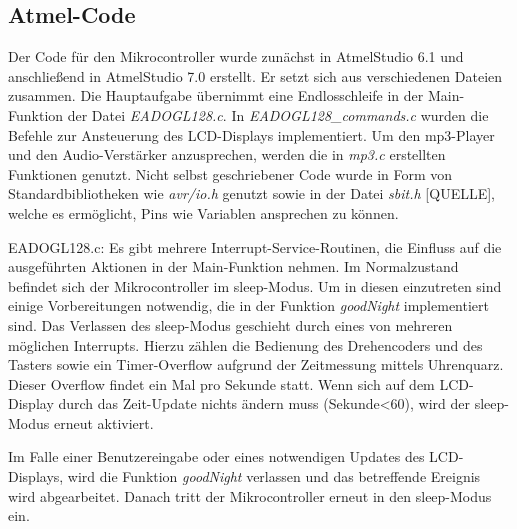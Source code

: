 \documentclass[journal, a4paper]{IEEEtran}
\begin{document}
	\subsection{Atmel-Code}
	\label{sc:Software:subsc:Atmel-Code}
	Der Code für den Mikrocontroller wurde zunächst in AtmelStudio 6.1 und anschließend in AtmelStudio 7.0 erstellt. Er setzt sich aus verschiedenen Dateien zusammen. Die Hauptaufgabe übernimmt eine Endlosschleife in der Main-Funktion der Datei \emph{EADOGL128.c}. In \emph{EADOGL128\_commands.c} wurden die Befehle zur Ansteuerung des LCD-Displays implementiert. Um den mp3-Player und den Audio-Verstärker anzusprechen, werden die in \emph{mp3.c} erstellten Funktionen genutzt. Nicht selbst geschriebener Code wurde in Form von Standardbibliotheken wie \emph{avr/io.h} genutzt sowie in der Datei \emph{sbit.h} [QUELLE], welche es ermöglicht, Pins wie Variablen ansprechen zu können.
	
	EADOGL128.c:
	Es gibt mehrere Interrupt-Service-Routinen, die Einfluss auf die ausgeführten Aktionen in der Main-Funktion nehmen. Im Normalzustand befindet sich der Mikrocontroller im sleep-Modus. Um in diesen einzutreten sind einige Vorbereitungen notwendig, die in der Funktion \emph{goodNight} implementiert sind. Das Verlassen des sleep-Modus geschieht durch eines von mehreren möglichen Interrupts. Hierzu zählen die Bedienung des Drehencoders und des Tasters sowie ein Timer-Overflow aufgrund der Zeitmessung mittels Uhrenquarz. Dieser Overflow findet ein Mal pro Sekunde statt. Wenn sich auf dem LCD-Display durch das Zeit-Update nichts ändern muss (Sekunde<60), wird der sleep-Modus erneut aktiviert. \par
	Im Falle einer Benutzereingabe oder eines notwendigen Updates des LCD-Displays, wird die Funktion \emph{goodNight} verlassen und das betreffende Ereignis wird abgearbeitet. Danach tritt der Mikrocontroller erneut in den sleep-Modus ein.
	
\end{document}
